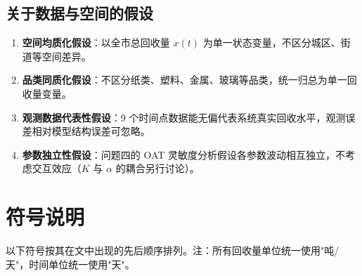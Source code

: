 \documentclass[12pt,a4paper]{ctexart}
\begin{document}
\subsection{关于数据与空间的假设}

\begin{enumerate}
    \item[7.] \textbf{空间均质化假设}：以全市总回收量 $x(t)$ 为单一状态变量，不区分城区、街道等空间差异。

    \item[8.] \textbf{品类同质化假设}：不区分纸类、塑料、金属、玻璃等品类，统一归总为单一回收量变量。

    \item[9.] \textbf{观测数据代表性假设}：9 个时间点数据能无偏代表系统真实回收水平，观测误差相对模型结构误差可忽略。

    \item[10.] \textbf{参数独立性假设}：问题四的 OAT 灵敏度分析假设各参数波动相互独立，不考虑交互效应（$K$ 与 $\alpha$ 的耦合另行讨论）。
\end{enumerate}

\section{符号说明}

以下符号按其在文中出现的先后顺序排列。注：所有回收量单位统一使用"吨/天"，时间单位统一使用"天"。
\end{document}
